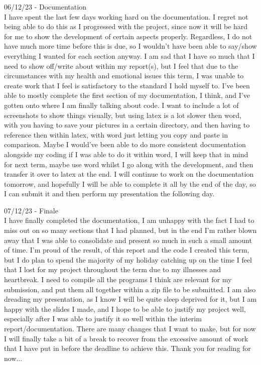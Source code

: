 \documentclass{article}
\begin{document}
06/12/23 - Documentation\\
I have spent the last few days working hard on the documentation. I regret not being able to do this as I progressed with the project, since now it will be hard for me to show the development of certain aspects properly. Regardless, I do not have much more time before this is due, so I wouldn't have been able to say/show everything I wanted for each section anyway. I am sad that I have so much that I need to show off/write about within my report(s), but I feel that due to the circumstances with my health and emotional issues this term, I was unable to create work that I feel is satisfactory to the standard I hold myself to. I've been able to mostly complete the first section of my documentation, I think, and I've gotten onto where I am finally talking about code. I want to include a lot of screenshots to show things visually, but using latex is a lot slower then word, with you having to save your pictures in a certain directory, and then having to reference then within latex, with word just letting you copy and paste in comparison. Maybe I would've been able to do more consistent documentation alongside my coding if I was able to do it within word, I will keep that in mind for next term, maybe use word whilst I go along with the development, and then transfer it over to latex at the end. I will continue to work on the documentation tomorrow, and hopefully I will be able to complete it all by the end of the day, so I can submit it and then perform my presentation the following day.\\\vspace{0.3cm}

07/12/23 - Finale\\
I have finally completed the documentation, I am unhappy with the fact I had to miss out on so many sections that I had planned, but in the end I'm rather blown away that I was able to consolidate and present so much in such a small amount of time. I'm proud of the result, of this report and the code I created this term, but I do plan to spend the majority of my holiday catching up on the time I feel that I lost for my project throughout the term due to my illnesses and heartbreak. I need to compile all the programs I think are relevant for my submission, and put them all together within a zip file to be submitted. I am also dreading my presentation, as I know I will be quite sleep deprived for it, but I am happy with the slides I made, and I hope to be able to justify my project well, especially after I was able to justify it so well within the interim report/documentation. There are many changes that I want to make, but for now I will finally take a bit of a break to recover from the excessive amount of work that I have put in before the deadline to achieve this. Thank you for reading for now...
\end{document}
